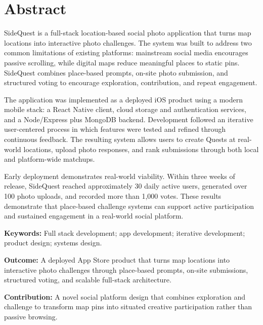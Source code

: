 \documentclass[12pt,a4paper,oneside]{report}
\begin{document}
\clearpage
{}

\setcounter{tocdepth}{1} %
\tableofcontents
\newpage

\chapter*{Abstract}
SideQuest is a full-stack location-based social photo application that turns map locations into interactive photo challenges. The system was built to address two common limitations of existing platforms: mainstream social media encourages passive scrolling, while digital maps reduce meaningful places to static pins. SideQuest combines place-based prompts, on-site photo submission, and structured voting to encourage exploration, contribution, and repeat engagement.

The application was implemented as a deployed iOS product using a modern mobile stack: a React Native client, cloud storage and authentication services, and a Node/Express plus MongoDB backend. Development followed an iterative user-centered process in which features were tested and refined through continuous feedback. The resulting system allows users to create Quests at real-world locations, upload photo responses, and rank submissions through both local and platform-wide matchups.

Early deployment demonstrates real-world viability. Within three weeks of release, SideQuest reached approximately 30 daily active users, generated over 100 photo uploads, and recorded more than 1{,}000 votes. These results demonstrate that place-based challenge systems can support active participation and sustained engagement in a real-world social platform.

\textbf{Keywords:} Full stack development; app development; iterative development; product design; systems design. 

\textbf{Outcome:} A deployed App Store product that turns map locations into interactive photo challenges through place-based prompts, on-site submissions, structured voting, and scalable full-stack architecture.

\textbf{Contribution:} A novel social platform design that combines exploration and challenge to transform map pins into situated creative participation rather than passive browsing.
\vspace{2\bigskipamount}
\end{document}
